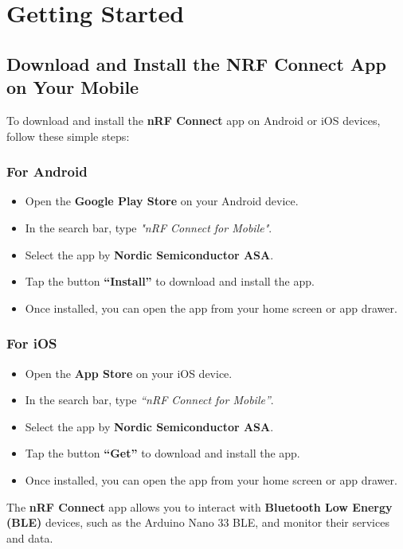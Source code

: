 %
%



\chapter{Getting Started}
\label{chap:list_of_items}


\section{Download and Install the NRF Connect App on Your Mobile}

To download and install the \textbf{nRF Connect} app on Android or iOS devices, follow these simple steps:

\subsection{For Android}

\begin{itemize}
	\item Open the \textbf{Google Play Store} on your Android device.
	\item In the search bar, type \textit{"nRF Connect for Mobile"}.
	\item Select the app by \textbf{Nordic Semiconductor ASA}.
	\item Tap the button \textbf{``Install''} to download and install the app.
	\item Once installed, you can open the app from your home screen or app drawer.
\end{itemize}


\subsection{For iOS}

\begin{itemize}
	\item Open the \textbf{App Store} on your iOS device.
	\item In the search bar, type \textit{``nRF Connect for Mobile''}.
	\item Select the app by \textbf{Nordic Semiconductor ASA}.
	\item Tap the button \textbf{``Get''} to download and install the app.
	\item Once installed, you can open the app from your home screen or app drawer.
\end{itemize}\noindent The \textbf{nRF Connect} app allows you to interact with \textbf{Bluetooth Low Energy (BLE)} devices, such as the Arduino Nano 33 BLE, and monitor their services and data.

